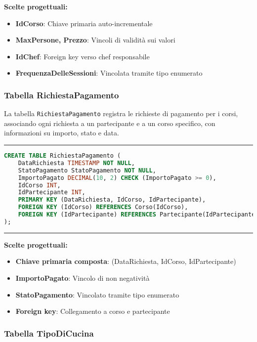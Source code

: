 \textbf{Scelte progettuali:}
\begin{itemize}
    \item \textbf{IdCorso}: Chiave primaria auto-incrementale
    \item \textbf{MaxPersone, Prezzo}: Vincoli di validità sui valori
    \item \textbf{IdChef}: Foreign key verso chef responsabile
    \item \textbf{FrequenzaDelleSessioni}: Vincolata tramite tipo enumerato
\end{itemize}

\subsubsection{Tabella RichiestaPagamento}

La tabella \texttt{RichiestaPagamento} registra le richieste di pagamento per i corsi, associando ogni richiesta a un partecipante e a un corso specifico, con informazioni su importo, stato e data.

\noindent\rule{\textwidth}{0.4pt}
\begin{lstlisting}[language=SQL, style=sqlstyle]
CREATE TABLE RichiestaPagamento (
    DataRichiesta TIMESTAMP NOT NULL,
    StatoPagamento StatoPagamento NOT NULL,
    ImportoPagato DECIMAL(10, 2) CHECK (ImportoPagato >= 0),
    IdCorso INT,
    IdPartecipante INT,
    PRIMARY KEY (DataRichiesta, IdCorso, IdPartecipante),
    FOREIGN KEY (IdCorso) REFERENCES Corso(IdCorso),
    FOREIGN KEY (IdPartecipante) REFERENCES Partecipante(IdPartecipante)
);
\end{lstlisting}
\noindent\rule{\textwidth}{0.4pt}

\textbf{Scelte progettuali:}
\begin{itemize}
    \item \textbf{Chiave primaria composta}: (DataRichiesta, IdCorso, IdPartecipante)
    \item \textbf{ImportoPagato}: Vincolo di non negatività
    \item \textbf{StatoPagamento}: Vincolato tramite tipo enumerato
    \item \textbf{Foreign key}: Collegamento a corso e partecipante
\end{itemize}

\subsubsection{Tabella TipoDiCucina}

